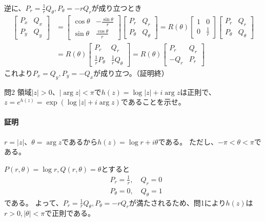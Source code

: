 逆に、$P_r=\frac{1}{r}Q_\theta,P_\theta=-rQ_r$が成り立つとき
\begin{align*}
    \begin{bmatrix}
        P_x & Q_x\\
        P_y & Q_y
    \end{bmatrix}
    &=
    \begin{bmatrix}
        \cos\theta & -\frac{\sin\theta}{r}\\
        \sin\theta & \frac{\cos\theta}{r}
    \end{bmatrix}
    \begin{bmatrix}
        P_r & Q_r\\
        P_\theta & Q_\theta
    \end{bmatrix}
    =
   R(\theta)
    \begin{bmatrix}
        1 & 0\\
        0 & \frac{1}{r}
    \end{bmatrix}
    \begin{bmatrix}
        P_r & Q_r\\
        P_\theta & Q_\theta
    \end{bmatrix}\\
    &=
    R(\theta)
    \begin{bmatrix}
        P_r & Q_r\\
        \frac{1}{r}P_\theta & \frac{1}{r}Q_\theta
    \end{bmatrix}
    =
    R(\theta)
    \begin{bmatrix}
        P_r & Q_r\\
        -Q_r & P_r
    \end{bmatrix}
\end{align*}
これより$P_x=Q_y,P_y=-Q_x$が成り立つ。（証明終）

\begin{mysimplebox}{問2}
領域$|z|>0$、$|\arg z|<\pi$で$h(z)=\log|z|+i\arg z$は正則で、
$z=e^{h(z)}=\exp(\log|z|+i\arg z)$であることを示せ。
\end{mysimplebox}
\paragraph{証明}
$r=|z|$、$\theta=\arg z$であるから$h(z)=\log r+i\theta$である。
ただし、$-\pi<\theta<\pi$である。

$P(r,\theta)=\log r, Q(r,\theta)=\theta$とすると
\begin{align*}
    &P_r=\frac{1}{r},\quad
    Q_r=0\\
    &P_\theta=0,\quad
    Q_\theta=1
\end{align*}
である。
よって、$P_r=\frac{1}{r}Q_\theta,P_\theta=-rQ_r$が満たされるため、問1により$h(z)$は$r>0,|\theta|<\pi$で正則である。

